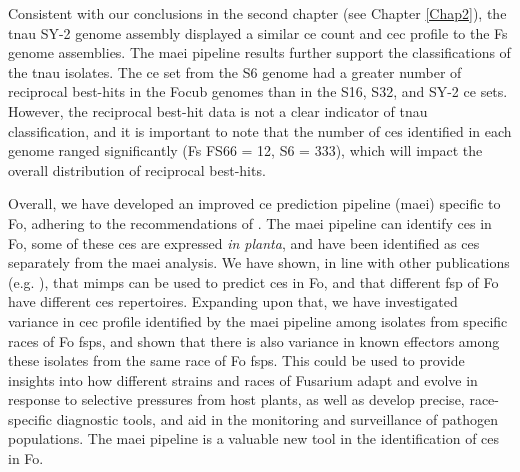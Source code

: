 Consistent with our conclusions in the second chapter (see Chapter \ref{Chap2}), the \ac{tnau} SY-2 genome assembly displayed a similar \ac{ce} count and \ac{cec} profile to the \ac{Fs} genome assemblies. The \ac{maei} pipeline results further support the classifications of the \ac{tnau} isolates. The \ac{ce} set from the S6 genome had a greater number of reciprocal best-hits in the \ac{Focub} genomes than in the S16, S32, and SY-2 \ac{ce} sets. However, the reciprocal best-hit data is not a clear indicator of \ac{tnau} classification, and it is important to note that the number of \acp{ce} identified in each genome ranged significantly (\ac{Fs} FS66 = 12, S6 = 333), which will impact the overall distribution of reciprocal best-hits. 

Overall, we have developed an improved \acl{ce} prediction pipeline (\ac{maei}) specific to \ac{Fo}, adhering to the recommendations of \textcite{Sperschneider2015, LoPresti2015, Todd2022}. The \ac{maei} pipeline can identify \acp{ce} in \ac{Fo}, some of these \acp{ce} are expressed \textit{in planta}, and have been identified as \acp{ce} separately from the \ac{maei} analysis. We have shown, in line with other publications (e.g. \textcite{Schmidt2013, Dam2016, FoEC2}), that  \acp{mimp} can be used to predict \acp{ce} in \ac{Fo}, and that different \ac{fsp} of \ac{Fo} have different \acp{ce} repertoires. Expanding upon that, we have investigated variance in \ac{cec} profile identified by the \ac{maei} pipeline among isolates from specific races of \ac{Fo} \acp{fsp}, and shown that there is also variance in known effectors among these isolates from the same race of \ac{Fo} \acp{fsp}. This could be used to provide insights into how different strains and races of Fusarium adapt and evolve in response to selective pressures from host plants, as well as develop precise, race-specific diagnostic tools, and aid in the monitoring and surveillance of pathogen populations. The \ac{maei} pipeline is a valuable new tool in the identification of \acp{ce} in \ac{Fo}.